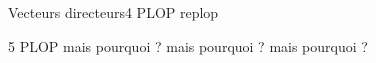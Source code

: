 


\begin{exo}{Vecteurs directeurs}{4}
	PLOP replop
\end{exo}
\newpage
\begin{exo}{}{5}
PLOP
\be[leftmargin=*]
 mais pourquoi ?
 mais pourquoi ?
 mais pourquoi ?
\ee
\end{exo}

